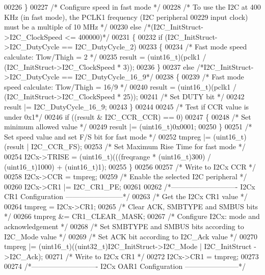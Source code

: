 \begin{DoxyCode}
00226   \}
00227   \textcolor{comment}{/* Configure speed in fast mode */}
00228   \textcolor{comment}{/* To use the I2C at 400 KHz (in fast mode), the PCLK1 frequency (I2C peripheral}
00229 \textcolor{comment}{     input clock) must be a multiple of 10 MHz */}
00230   \textcolor{keywordflow}{else} \textcolor{comment}{/*(I2C\_InitStruct->I2C\_ClockSpeed <= 400000)*/}
00231   \{
00232     \textcolor{keywordflow}{if} (I2C\_InitStruct->I2C_DutyCycle == I2C_DutyCycle_2)
00233     \{
00234       \textcolor{comment}{/* Fast mode speed calculate: Tlow/Thigh = 2 */}
00235       result = (uint16\_t)(pclk1 / (I2C\_InitStruct->I2C_ClockSpeed * 3));
00236     \}
00237     \textcolor{keywordflow}{else} \textcolor{comment}{/*I2C\_InitStruct->I2C\_DutyCycle == I2C\_DutyCycle\_16\_9*/}
00238     \{
00239       \textcolor{comment}{/* Fast mode speed calculate: Tlow/Thigh = 16/9 */}
00240       result = (uint16\_t)(pclk1 / (I2C\_InitStruct->I2C_ClockSpeed * 25));
00241       \textcolor{comment}{/* Set DUTY bit */}
00242       result |= I2C_DutyCycle_16_9;
00243     \}
00244 
00245     \textcolor{comment}{/* Test if CCR value is under 0x1*/}
00246     \textcolor{keywordflow}{if} ((result & I2C_CCR_CCR) == 0)
00247     \{
00248       \textcolor{comment}{/* Set minimum allowed value */}
00249       result |= (uint16\_t)0x0001;
00250     \}
00251     \textcolor{comment}{/* Set speed value and set F/S bit for fast mode */}
00252     tmpreg |= (uint16\_t)(result | I2C_CCR_FS);
00253     \textcolor{comment}{/* Set Maximum Rise Time for fast mode */}
00254     I2Cx->TRISE = (uint16\_t)(((freqrange * (uint16\_t)300) / (uint16\_t)1000) + (uint16\_t)1);
00255   \}
00256 
00257   \textcolor{comment}{/* Write to I2Cx CCR */}
00258   I2Cx->CCR = tmpreg;
00259   \textcolor{comment}{/* Enable the selected I2C peripheral */}
00260   I2Cx->CR1 |= I2C_CR1_PE;
00261 
00262 \textcolor{comment}{/*---------------------------- I2Cx CR1 Configuration ------------------------*/}
00263   \textcolor{comment}{/* Get the I2Cx CR1 value */}
00264   tmpreg = I2Cx->CR1;
00265   \textcolor{comment}{/* Clear ACK, SMBTYPE and  SMBUS bits */}
00266   tmpreg &= CR1_CLEAR_MASK;
00267   \textcolor{comment}{/* Configure I2Cx: mode and acknowledgement */}
00268   \textcolor{comment}{/* Set SMBTYPE and SMBUS bits according to I2C\_Mode value */}
00269   \textcolor{comment}{/* Set ACK bit according to I2C\_Ack value */}
00270   tmpreg |= (uint16\_t)((uint32\_t)I2C\_InitStruct->I2C_Mode | I2C\_InitStruct
      ->I2C_Ack);
00271   \textcolor{comment}{/* Write to I2Cx CR1 */}
00272   I2Cx->CR1 = tmpreg;
00273 
00274 \textcolor{comment}{/*---------------------------- I2Cx OAR1 Configuration -----------------------*/}

\end{DoxyCode}
